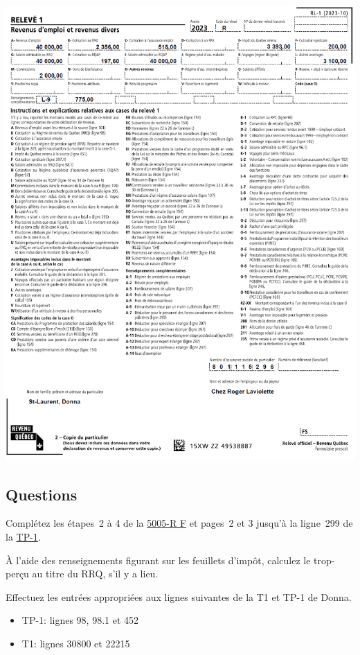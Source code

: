 \noindent
\includegraphics[width=\textwidth]{probleme/chapitre-3/RL1.png}


\subsection{Questions}
Complétez les étapes~2 à 4 de la \href{https://www.canada.ca/fr/agence-revenu/services/formulaires-publications/trousses-impot-toutes-annees-imposition/trousse-generale-impot-prestations/quebec/5005-r.html}{5005-R F} et pages~2 et 3 jusqu'à la ligne~299 de la \href{https://www.revenuquebec.ca/documents/fr/formulaires/tp/2023-12/TP-1.D%282023-12%29.pdf}{TP-1}.

\setcounter{question}{0}
\begin{question}
	À l'aide des renseignements figurant sur les feuillets d'impôt, calculez le trop-perçu au titre du RRQ, s'il y a lieu.
\end{question}

\begin{question}
	Effectuez les entrées appropriées aux lignes suivantes de la T1 et TP-1 de Donna.
	\begin{itemize}
		\item TP-1: lignes 98, 98.1 et 452 
		\item T1: lignes 30800 et 22215
	\end{itemize}
\end{question}

